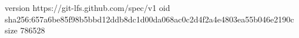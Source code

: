 version https://git-lfs.github.com/spec/v1
oid sha256:657a6be85f98b5bbd12ddb8dc1d00da068ac0c2d4f2a4e4803ea55b046e2190c
size 786528
